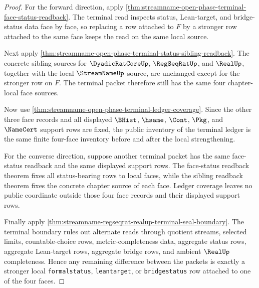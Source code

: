 \begin{proof}
For the forward direction, apply \autoref{thm:streamname-open-phase-terminal-face-status-readback}. The terminal read inspects status, Lean-target, and bridge-status data face by face, so replacing a row attached to $F$ by a stronger row attached to the same face keeps the read on the same local source.

Next apply \autoref{thm:streamname-open-phase-terminal-status-sibling-readback}. The concrete sibling sources for $\DyadicRatCoreUp$, $\RegSeqRatUp$, and $\RealUp$, together with the local $\StreamNameUp$ source, are unchanged except for the stronger row on $F$. The terminal packet therefore still has the same four chapter-local face sources.

Now use \autoref{thm:streamname-open-phase-terminal-ledger-coverage}. Since the other three face records and all displayed $\BHist$, $\hsame$, $\Cont$, $\Pkg$, and $\NameCert$ support rows are fixed, the public inventory of the terminal ledger is the same finite four-face inventory before and after the local strengthening.

For the converse direction, suppose another terminal packet has the same face-status readback and the same displayed support rows. The face-status readback theorem fixes all status-bearing rows to local faces, while the sibling readback theorem fixes the concrete chapter source of each face. Ledger coverage leaves no public coordinate outside those four face records and their displayed support rows.

Finally apply \autoref{thm:streamname-regseqrat-realup-terminal-seal-boundary}. The terminal boundary rules out alternate reads through quotient streams, selected limits, countable-choice rows, metric-completeness data, aggregate status rows, aggregate Lean-target rows, aggregate bridge rows, and ambient $\RealUp$ completeness. Hence any remaining difference between the packets is exactly a stronger local \texttt{formalstatus}, \texttt{leantarget}, or \texttt{bridgestatus} row attached to one of the four faces.
\end{proof}

